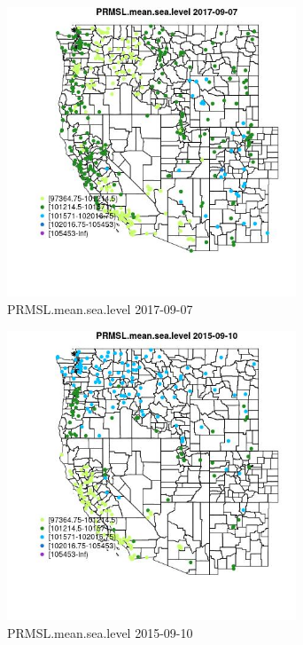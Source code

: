 \begin{figure} 
\centering  
\includegraphics[width=0.77\textwidth]{Code_Outputs/Report_ML_input_PM25_Step4_part_e_de_duplicated_aves_compiled_2019-05-20wNAs_MapObsPRMSLmeansealevel2017-09-07.jpg} 
\caption{\label{fig:Report_ML_input_PM25_Step4_part_e_de_duplicated_aves_compiled_2019-05-20wNAsMapObsPRMSLmeansealevel2017-09-07}PRMSL.mean.sea.level 2017-09-07} 
\end{figure} 
 

\clearpage 

\begin{figure} 
\centering  
\includegraphics[width=0.77\textwidth]{Code_Outputs/Report_ML_input_PM25_Step4_part_e_de_duplicated_aves_compiled_2019-05-20wNAs_MapObsPRMSLmeansealevel2015-09-10.jpg} 
\caption{\label{fig:Report_ML_input_PM25_Step4_part_e_de_duplicated_aves_compiled_2019-05-20wNAsMapObsPRMSLmeansealevel2015-09-10}PRMSL.mean.sea.level 2015-09-10} 
\end{figure} 
 

